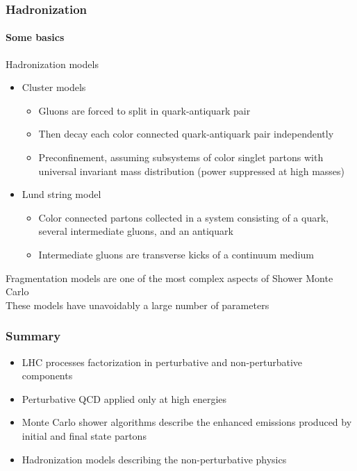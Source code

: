 \documentclass[aspectratio=43]{beamer}
\begin{document}
\begin{frame}

\frametitle{Hadronization}
\framesubtitle{Some basics}
	
	\footnotesize Hadronization models
	\begin{itemize}
		\item Cluster models
		\begin{itemize}
			\item \footnotesize Gluons are forced to split in quark-antiquark pair
			\item \footnotesize Then decay each color connected quark-antiquark pair independently
			\item \footnotesize Preconfinement, assuming subsystems of color singlet partons
			with universal invariant mass distribution (power suppressed at high masses)	
		\end{itemize}
		\item Lund string model
		\begin{itemize}
			\item \footnotesize Color connected partons collected in a system
			consisting of a quark, several intermediate gluons, and an antiquark
			\item \footnotesize Intermediate gluons are transverse kicks of a continuum medium
		\end{itemize}
	\end{itemize}

	\footnotesize Fragmentation models are one of the most complex aspects of Shower Monte Carlo \\
	\footnotesize These models have unavoidably a large number of parameters

\end{frame}
\begin{frame}

	\frametitle{Summary}

\begin{itemize}
	\item \footnotesize LHC processes factorization in perturbative and non-perturbative components
	\item \footnotesize Perturbative QCD applied only at high energies
	\item \footnotesize Monte Carlo shower algorithms describe the enhanced emissions produced by initial and final state partons
	\item \footnotesize Hadronization models describing the non-perturbative physics
\end{itemize}

\end{frame}
\end{document}
